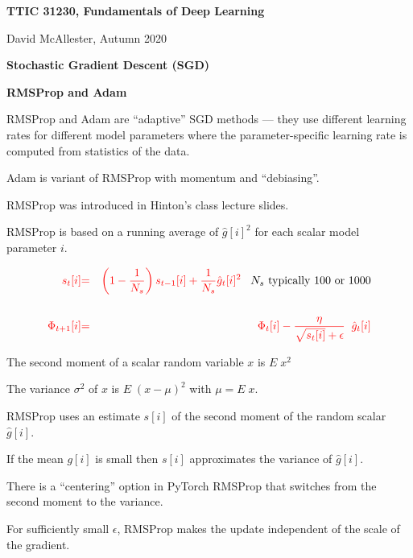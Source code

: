 


\newcommand{\solution}[1]{\bigskip {\bf Solution}: #1}



{\Huge
  \centerline{\bf TTIC 31230, Fundamentals of Deep Learning}
  \bigskip
  \centerline{David McAllester, Autumn 2020}
  \vfill
  \centerline{\bf Stochastic Gradient Descent (SGD)}
  \vfill
  \centerline{\bf RMSProp and Adam}


RMSProp and Adam are ``adaptive'' SGD methods --- they use different learning rates for different model parameters where the parameter-specific learning rate is
computed from statistics of the data.

\vfill
Adam is variant of RMSProp with momentum and ``debiasing''.


RMSProp was introduced in Hinton's class lecture slides.

\vfill
RMSProp is based on a running average of $\hat{g}[i]^2$ for each scalar model parameter $i$.

\begin{eqnarray*}
{\color{red} s_t[i]} & {\color{red} =} & {\color{red} \left(1-\frac{1}{N_s}\right) s_{t-1}[i] + \frac{1}{N_s} \hat{g}_t[i]^2}\;\;\;\mbox{$N_s$ typically 100 or 1000} \\
\\
{\color{red} \Phi_{t+1}[i]} & {\color{red} =} & {\color{red} \Phi_t[i] - \frac{\eta}{\sqrt{s_t[i]} + \epsilon}\;\; \hat{g}_t[i]}
\end{eqnarray*}

The second moment of a scalar random variable $x$ is $E\;x^2$

\vfill
The variance $\sigma^2$ of $x$ is $E \;(x - \mu)^2$ with $\mu = E\;x$.

\vfill
RMSProp uses an estimate $s[i]$ of the second moment of the random scalar $\hat{g}[i]$.

\vfill
If the mean $g[i]$ is small then $s[i]$ approximates the variance of $\hat{g}[i]$.

\vfill
There is a ``centering'' option in PyTorch RMSProp that switches from the second moment to the variance.


For sufficiently small $\epsilon$, RMSProp makes the update independent of the scale of the gradient.

}
